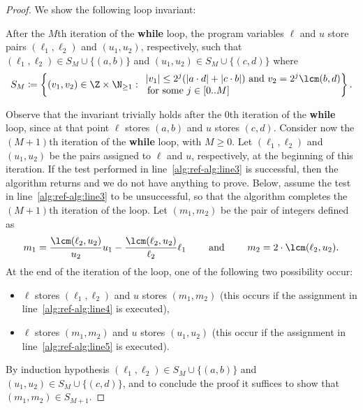 \begin{proof}
  
  We show the following loop invariant: 
  \begin{center}
    \begin{minipage}{0.85\linewidth}
      After the $M$th iteration of the \textbf{while} loop, the program variables $\ell$ and $u$
      store pairs $(\ell_1,\ell_2)$ and $(u_1,u_2)$, respectively, such that $(\ell_1,\ell_2) \in S_M \cup \{(a,b)\}$ 
      and $(u_1,u_2) \in S_M \cup \{(c,d)\}$ 
      where 
      \[ 
        S_M \coloneqq \left\{ (v_1,v_2) \in \Z \times \N_{\geq 1} :\ 
        \begin{aligned} 
          &\abs{v_1} \leq 2^{j}(\abs{a \cdot d} + \abs{c \cdot b}) \text{ and } 
          v_2 = 2^{j} \lcm(b,d)\\[-3pt]
          &\text{ for some } j \in [0..M]
        \end{aligned}
        \right\}.
      \]
    \end{minipage}
  \end{center}
  Observe that the invariant trivially holds after the $0$th iteration of the
  \textbf{while} loop, since at that point $\ell$ stores $(a,b)$ and $u$ stores
  $(c,d)$. Consider now the $(M+1)$th iteration of the \textbf{while} loop, with
  $M \geq 0$. Let $(\ell_1,\ell_2)$ and $(u_1,u_2)$ be the pairs assigned to
  $\ell$ and $u$, respectively, at the beginning of this iteration. If the test
  performed in line~\ref{alg:ref-alg:line3} is successful, then the algorithm
  returns and we do not have anything to prove. Below, assume the test in
  line~\ref{alg:ref-alg:line3} to be unsuccessful, so that the algorithm
  completes the $(M+1)$th iteration of the loop. Let $(m_1,m_2)$ be the pair of
  integers defined as
  \[ 
    m_1 = \frac{\lcm(\ell_2,u_2)}{u_2}u_1 - \frac{\lcm(\ell_2,u_2)}{\ell_2}\ell_1 
    \qquad\text{ and }\qquad
    m_2  = 2 \cdot \lcm(\ell_2,u_2).
  \]
  At the end of the iteration of the loop, one of the following two possibility occur: 
  \begin{itemize}
    \item $\ell$ stores $(\ell_1,\ell_2)$ and $u$ stores $(m_1,m_2)$ (this occurs if the assignment in line~\ref{alg:ref-alg:line4} is executed), 
    \item $\ell$ stores $(m_1,m_2)$ and $u$ stores $(u_1,u_2)$ (this occur if the assignment in line~\ref{alg:ref-alg:line5} is executed). 
  \end{itemize}
  By induction hypothesis $(\ell_1,\ell_2) \in S_M \cup \{(a,b)\}$ 
  and $(u_1,u_2) \in S_M \cup \{(c,d)\}$, 
  and to conclude the proof it suffices to show that $(m_1,m_2) \in S_{M+1}$.

\end{proof}
